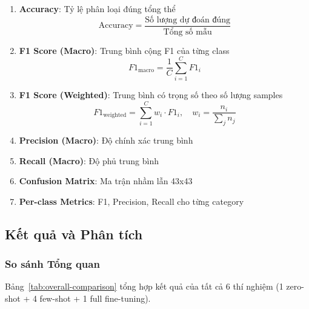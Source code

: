 \begin{enumerate}
    \item \textbf{Accuracy}: Tỷ lệ phân loại đúng tổng thể
    \begin{equation}
        \text{Accuracy} = \frac{\text{Số lượng dự đoán đúng}}{\text{Tổng số mẫu}}
    \end{equation}

    \item \textbf{F1 Score (Macro)}: Trung bình cộng F1 của từng class
    \begin{equation}
        F1_{\text{macro}} = \frac{1}{C}\sum_{i=1}^{C} F1_i
    \end{equation}

    \item \textbf{F1 Score (Weighted)}: Trung bình có trọng số theo số lượng samples
    \begin{equation}
        F1_{\text{weighted}} = \sum_{i=1}^{C} w_i \cdot F1_i, \quad w_i = \frac{n_i}{\sum_j n_j}
    \end{equation}

    \item \textbf{Precision (Macro)}: Độ chính xác trung bình
    \item \textbf{Recall (Macro)}: Độ phủ trung bình
    \item \textbf{Confusion Matrix}: Ma trận nhầm lẫn 43x43
    \item \textbf{Per-class Metrics}: F1, Precision, Recall cho từng category
\end{enumerate}

\subsection{Kết quả và Phân tích}\label{subsec:results}

\subsubsection{So sánh Tổng quan}
Bảng~\ref{tab:overall-comparison} tổng hợp kết quả của tất cả 6 thí nghiệm (1 zero-shot + 4 few-shot + 1 full fine-tuning).

